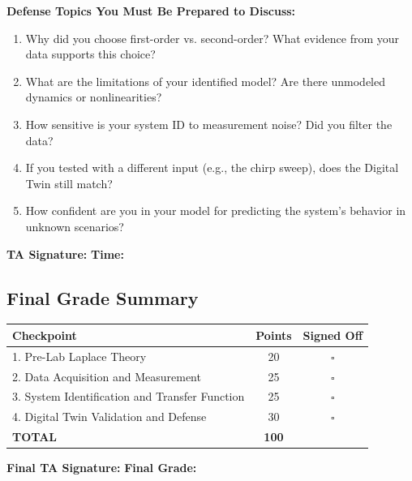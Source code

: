 \documentclass[11pt,letterpaper]{article}
\begin{document}
\noindent
\textbf{Defense Topics You Must Be Prepared to Discuss:}
\begin{enumerate}
    \item Why did you choose first-order vs. second-order? What evidence from your data supports this choice?
    \item What are the limitations of your identified model? Are there unmodeled dynamics or nonlinearities?
    \item How sensitive is your system ID to measurement noise? Did you filter the data?
    \item If you tested with a different input (e.g., the chirp sweep), does the Digital Twin still match?
    \item How confident are you in your model for predicting the system's behavior in unknown scenarios?
\end{enumerate}

\vspace{0.3cm}
\textbf{TA Signature:} \underline{\hspace{2.5cm}} \quad \textbf{Time:} \underline{\hspace{1.5cm}}

\vspace{1cm}

\subsection*{Final Grade Summary}

\begin{center}
\begin{tabular}{|l|c|c|}
\hline
\textbf{Checkpoint} & \textbf{Points} & \textbf{Signed Off} \\
\hline
1. Pre-Lab Laplace Theory & 20 & $\square$ \\
2. Data Acquisition and Measurement & 25 & $\square$ \\
3. System Identification and Transfer Function & 25 & $\square$ \\
4. Digital Twin Validation and Defense & 30 & $\square$ \\
\hline
\textbf{TOTAL} & \textbf{100} & \\
\hline
\end{tabular}
\end{center}

\vspace{0.5cm}

\textbf{Final TA Signature:} \underline{\hspace{4cm}} \quad \textbf{Final Grade:} \underline{\hspace{1.5cm}}
\end{document}
